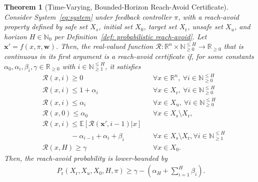 \documentclass[journal,twoside,web]{ieeecolor}
\newcommand{\ml}[1]{{\color{blue}[ML: #1]}}
\newcommand{\unsafe}{\mathrm{u}}
\newcommand{\safe}{\mathrm{s}}
\newcommand{\reach}{\mathrm{r}}
\newcommand{\px}{\mathbf{x}}
\newcommand{\nx}{\mathbf{x}'}
\newcommand{\reals}{\mathbb{R}}
\newcommand{\naturals}{\mathbb{N}}
\newcommand{\hor}{H}
\newcommand{\RA}{\mathcal{R}}
\newcommand{\Pfin}{P_{\reach}(X_{\reach}, X_u, X_0, \hor, \pi)}
\theoremstyle{definition}
\theoremstyle{plain}
\newtheorem{theorem}{Theorem}
\theoremstyle{plain}
\begin{document}
\begin{theorem}[Time-Varying, Bounded-Horizon Reach-Avoid Certificate]
\label{th:reach-avoid value function}
    Consider System~\eqref{eq:system} 
    under feedback controller $\pi$, 
    with a reach-avoid property defined by safe set $X_s$, initial set $X_0$, target set $X_\reach$, unsafe set $X_u$, and horizon $\hor \in \naturals_0$ per Definition~\ref{def: probabilistic reach-avoid}. Let $\nx = f(x, \pi, \textbf{w})$. Then, the real-valued function $\RA : \mathbb{R}^n \times \naturals^{\leq \hor}_{\geq 0} \to \mathbb{R}_{\geq 0}$ that is continuous in its first argument is a \emph{reach-avoid} certificate if, for some constants $\alpha_0, \alpha_i,\beta_i,\gamma \in \reals_{\geq 0}$ with $i \in \naturals^{\leq \hor}_{\geq 1}$, it satisfies 
    \begin{subequations}
        \label{eq: certificate tv finite H}
        \begin{align}
            \!\!\!\!\!&\RA(x, i) \geq 0 && \forall x \in \mathbb{R}^n, \ \forall i \in \naturals^{\leq \hor}_{\geq 0} \label{eq:nonneg-tv} \\
            &\RA(x, i) \leq 1 + \alpha_i && \forall x \in X_\reach, \ \forall i \in \naturals^{\leq \hor}_{\geq 0} \label{eq:reach-tv} \\
            &\RA(x, i) \leq \alpha_i && \forall x \in X_\unsafe, \ \forall i \in \naturals^{\leq \hor}_{\geq 0} \label{eq:nsafe-tv} \\
            &\RA(x, 0) \leq \alpha_0 && \forall x \in X_\safe\setminus X_\reach,  \label{eq:initial-nsafe-tv} \\
            &\RA(x, i) \leq \mathbb{E}[\RA(\px', i-1) | x ]  && \nonumber \\
            &  \qquad \qquad  - \alpha_{i-1} + \alpha_i + \beta_i 
                 && \forall x \in X_\safe \! \setminus \! X_\reach,  \forall i \in \naturals^{\leq \hor}_{\geq 1} \label{eq:exp-tv}\\
            &\RA(x, \hor) \geq \gamma && \forall x \in X_0. \label{eq:Vinitial_ss}
        \end{align}
    \end{subequations}
    Then, the reach-avoid probability is lower-bounded by
    \begin{align}
        \label{eq: probability bound for TV reach-avoid}
        \Pfin \geq \gamma - \left( \alpha_\hor + \sum_{i=1}^{ \hor} \beta_i
        \right ).
    \end{align}  
\end{theorem}
\end{document}
